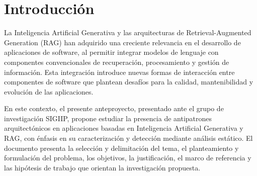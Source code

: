 \section{Introducción}
La Inteligencia Artificial Generativa y las arquitecturas de Retrieval-Augmented Generation (RAG) han adquirido una creciente relevancia en el desarrollo de aplicaciones de software, al permitir integrar modelos de lenguaje con componentes convencionales de recuperación, procesamiento y gestión de información. Esta integración introduce nuevas formas de interacción entre componentes de software que plantean desafíos para la calidad, mantenibilidad y evolución de las aplicaciones.

En este contexto, el presente anteproyecto, presentado ante el grupo de investigación SIGIIP, propone estudiar la presencia de antipatrones arquitectónicos en aplicaciones basadas en Inteligencia Artificial Generativa y RAG, con énfasis en su caracterización y detección mediante análisis estático. El documento presenta la selección y delimitación del tema, el planteamiento y formulación del problema, los objetivos, la justificación, el marco de referencia y las hipótesis de trabajo que orientan la investigación propuesta.